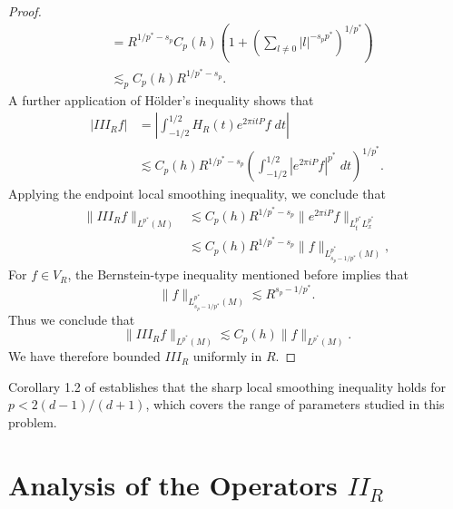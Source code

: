 \begin{proof}
\begin{align*}
        &= R^{1/p^* - s_p} C_p(h) \left( 1 + \left( \sum_{l \neq 0} |l|^{-s_p p^*} \right)^{1/p^*} \right) \\
        &\lesssim_p C_p(h) R^{1/p^* - s_p}.
    \end{align*}
    A further application of H\"{o}lder's inequality shows that
    \begin{align*}
        | III_R f | &= \left| \int_{-1/2}^{1/2} H_R(t) e^{2 \pi i t P} f\; dt \right|\\
        &\lesssim C_p(h) R^{1/p^* - s_p} \left( \int_{-1/2}^{1/2} |e^{2 \pi i P} f|^{p^*}\; dt \right)^{1/p^*}.
    \end{align*}
    Applying the endpoint local smoothing inequality, we conclude that
    \begin{align*}
        \| III_R f \|_{L^{p^*}(M)} &\lesssim C_p(h) R^{1/p^* - s_p} \| e^{2 \pi i P} f \|_{L^{p^*}_t L^{p^*}_x}\\
        &\lesssim C_p(h) R^{1/p^* - s_p} \| f \|_{L^{p^*}_{s_p - 1/p^*}(M)},
    \end{align*}
    For $f \in V_R$, the Bernstein-type inequality mentioned before implies that
    \[ \| f \|_{L^{p^*}_{s_p - 1/p^*}(M)} \lesssim R^{s_p - 1/p^*}. \]
    Thus we conclude that
    \[ \| III_R f \|_{L^{p^*}(M)} \lesssim C_p(h) \| f \|_{L^{p^*}(M)}. \]
    We have therefore bounded $III_R$ uniformly in $R$.
\end{proof}

Corollary 1.2 of \cite{LeeSeeger} establishes that the sharp local smoothing inequality holds for $p < 2(d-1)/(d+1)$, which covers the range of parameters studied in this problem.

\section{Analysis of the Operators $II_R$}

